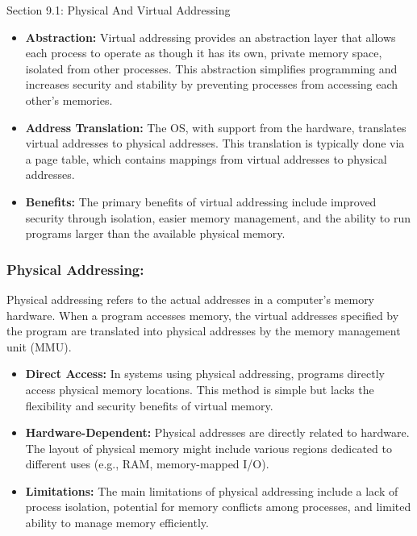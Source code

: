 \begin{notes}{Section 9.1: Physical And Virtual Addressing}
    \begin{itemize}
        \item \textbf{Abstraction:} Virtual addressing provides an abstraction layer that allows each process to operate as though it has its own, private memory space, isolated from other processes. 
        This abstraction simplifies programming and increases security and stability by preventing processes from accessing each other's memories.
        \item \textbf{Address Translation:} The OS, with support from the hardware, translates virtual addresses to physical addresses. This translation is typically done via a page table, which 
        contains mappings from virtual addresses to physical addresses.
        \item \textbf{Benefits:} The primary benefits of virtual addressing include improved security through isolation, easier memory management, and the ability to run programs larger than the 
        available physical memory.
    \end{itemize}
    
    \subsubsection*{Physical Addressing:}

    Physical addressing refers to the actual addresses in a computer's memory hardware. When a program accesses memory, the virtual addresses specified by the program are translated into physical 
    addresses by the memory management unit (MMU).
    
    \begin{itemize}
        \item \textbf{Direct Access:} In systems using physical addressing, programs directly access physical memory locations. This method is simple but lacks the flexibility and security benefits 
        of virtual memory.
        \item \textbf{Hardware-Dependent:} Physical addresses are directly related to hardware. The layout of physical memory might include various regions dedicated to different uses (e.g., RAM, memory-mapped I/O).
        \item \textbf{Limitations:} The main limitations of physical addressing include a lack of process isolation, potential for memory conflicts among processes, and limited ability to manage 
        memory efficiently.
    \end{itemize}
    

\end{notes}
